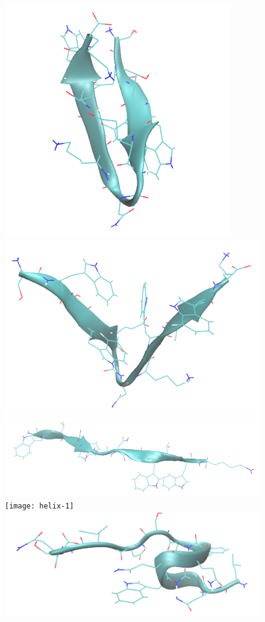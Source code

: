 \documentclass{article}[12pt]
\numberwithin{equation}{section}
\begin{document}
\begin{figure}[H]
	\centering{}
	\captionsetup{justification=centering}
	\includegraphics[scale=0.21]{hairpin-1}
	\includegraphics[scale=0.21]{hairpin-2}
	\includegraphics[scale=0.21]{hairpin-3}
	\texttt{[image: helix-1]}
	\includegraphics[scale=0.35]{helix-2}

\end{figure}
\end{document}

